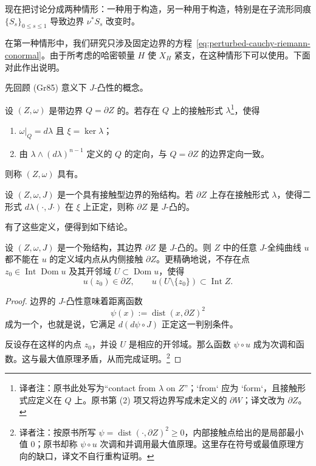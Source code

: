 现在把讨论分成两种情形：一种用于构造\termFloerBoundaryMap{}，另一种用于构造\termChainMap{}，特别是在子流形同痕 $\{S_s\}_{0\le s\le1}$ 导致边界 $\nu^*S_s$ 改变时。

在第一种情形中，我们研究只涉及固定边界的方程~\eqref{eq:perturbed-cauchy-riemann-conormal}。由于所考虑的哈密顿量 $H$ 使 $X_H$ 紧支，在这种情形下可以使用\termStrongMaximumPrinciple{}。下面对此作出说明。

先回顾\personGromov{} (Gr85) 意义下 $J$-凸性的概念。

\begin{definition}
\label{def:contact-type-boundary}
设 $(Z,\omega)$ 是带边界 $Q=\partial Z$ 的\termSymplecticManifold{}。若存在 $Q$ 上的接触形式 $\lambda$\footnote{译者注：原书此处写为“contact from $\lambda$ on $Z$”；`from` 应为 `form`，且接触形式应定义在 $Q$ 上。原书第 (2) 项又将边界写成未定义的 $\partial W$；译文改为 $\partial Z$。}，使得
\begin{enumerate}[label=(\arabic*)]
  \item $\omega|_Q=d\lambda$ 且 $\xi=\ker\lambda$；
  \item 由 $\lambda\wedge(d\lambda)^{n-1}$ 定义的 $Q$ 的定向，与 $Q=\partial Z$ 的边界定向一致。
\end{enumerate}
则称 $(Z,\omega)$ 具有\termContactTypeBoundary{}。
\end{definition}

\begin{definition}
\label{def:j-convex-boundary}
设 $(Z,\omega,J)$ 是一个具有接触型边界的殆\personKahler{}结构。若 $\partial Z$ 上存在接触形式 $\lambda$，使得二形式 $d\lambda(\mathord\cdot,J\mathord\cdot)$ 在 $\xi$ 上正定，则称 $\partial Z$ 是 $J$-凸的。
\end{definition}

有了这些定义，便得到如下结论。

\begin{proposition}
\label{prop:j-convex-maximum-principle}
设 $(Z,\omega,J)$ 是一个殆\personKahler{}结构，其边界 $\partial Z$ 是 $J$-凸的。则 $Z$ 中的任意 $J$-全纯曲线 $u$ 都不能在 $u$ 的定义域内点从内侧接触 $\partial Z$。更精确地说，不存在点 $z_0\in\operatorname{Int}\operatorname{Dom}u$ 及其开邻域 $U\subset\operatorname{Dom}u$，使得
\[
  u(z_0)\in\partial Z,
  \qquad
  u(U\setminus\{z_0\})\subset\operatorname{Int}Z.
\]
\end{proposition}

\begin{proof}
边界的 $J$-凸性意味着距离函数
\[
  \psi(x):=\operatorname{dist}(x,\partial Z)^2
\]
成为一个\termPlurisubharmonicFunction{}，也就是说，它满足 $d(d\psi\circ J)$ 正定这一判别条件。

反设存在这样的内点 $z_0$，并设 $U$ 是相应的开邻域。那么函数 $\psi\circ u$ 成为次调和函数。这与最大值原理矛盾，从而完成证明。\footnote{译者注：按原书所写 $\psi=\operatorname{dist}(\mathord\cdot,\partial Z)^2\ge0$，内部接触点给出的是局部最小值 0；原书却称 $\psi\circ u$ 次调和并调用最大值原理。这里存在符号或最值原理方向的缺口，译文不自行重构证明。}
\end{proof}

